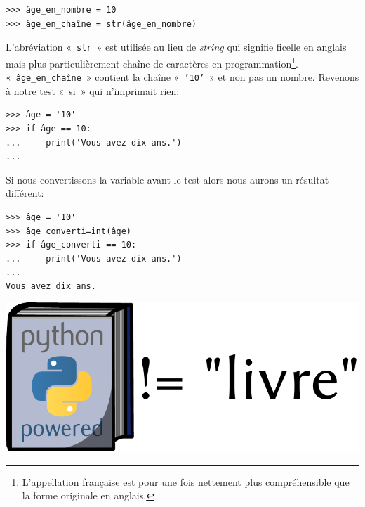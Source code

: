 \begin{Verbatim}[frame=single,rulecolor=\color{mbleu}, label=à taper]
>>> âge_en_nombre = 10
>>> âge_en_chaîne = str(âge_en_nombre)
\end{Verbatim}

L'abréviation «~\texttt{str}~» est utilisée au lieu de \emph{string} qui signifie ficelle en anglais mais plus particulièrement chaîne de caractères en programmation\footnote{L'appellation française est pour une fois nettement plus compréhensible que la forme originale en anglais.}.\\

«~\texttt{âge\_en\_chaîne}~» contient la chaîne «~\texttt{'10'}~» et non pas un nombre. Revenons à notre test «~si~» qui n'imprimait rien:

\begin{Verbatim}[frame=single,rulecolor=\color{green}, label=à taper avec attention]
>>> âge = '10'
>>> if âge == 10:
...     print('Vous avez dix ans.')
...
\end{Verbatim}

Si nous convertissons la variable avant le test alors nous aurons un résultat différent:

\begin{Verbatim}[frame=single,rulecolor=\color{green}, label=à taper avec attention]
>>> âge = '10'
>>> âge_converti=int(âge)
>>> if âge_converti == 10:
...     print('Vous avez dix ans.')
...
Vous avez dix ans.
\end{Verbatim}

\vfill
\begin{center}
\includegraphics[scale=1]{images/livre.pdf} 
\end{center}
\vfill

\clearemptydoublepage
